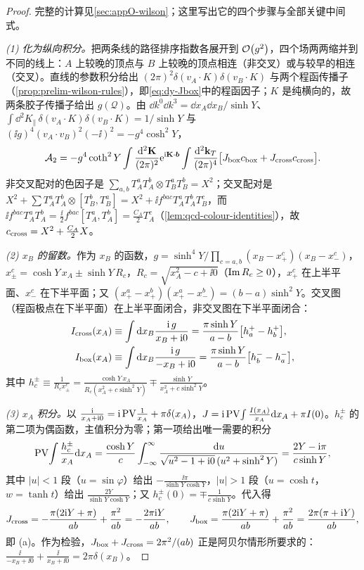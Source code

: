 \begin{proof}
完整的计算见\cref{sec:appO-wilson}；这里写出它的四个步骤与全部关键中间式。

\emph{(1) 化为纵向积分。}把两条线的路径排序指数各展开到 $\mathcal{O}\!\left(g^2\right)$，四个场两两缩并到不同的线上：$A$ 上较晚的顶点与 $B$ 上较晚的顶点相连（非交叉）或与较早的相连（交叉）。直线的参数积分给出 $(2\pi)^2\delta(v_A\cdot K)\delta(v_B\cdot K)$ 与两个程函传播子（\cref{prop:prelim-wilson-rules}），即\cref{eq:dy-Jbox}中的程函因子；$K$ 是纯横向的，故两条胶子传播子给出 $g(\mathcal Q)$。由 $\dd k^0\dd k^3=\dd x_A\dd x_B/\sinh Y$、$\int\dd^2K_\parallel\,\delta(v_A\cdot K)\delta(v_B\cdot K)=1/\sinh Y$ 与 $(\ii g)^4(v_A\cdot v_B)^2(-\ii)^2=-g^4\cosh^2Y$，
\[
\mathcal A_2=-g^4\coth^2Y\int\frac{\mathrm{d}^2\mathbf K}{(2\pi)^2}\mathrm{e}^{\mathrm{i}\mathbf K\cdot\boldsymbol b}\int\frac{\mathrm{d}^2\mathbf k_T}{(2\pi)^4}\big[J_{\rm box}c_{\rm box}+J_{\rm cross}c_{\rm cross}\big].
\]
非交叉配对的色因子是 $\sum_{a,b}T^a_AT^b_A\otimes T^a_BT^b_B=X^2$；交叉配对是 $X^2+\sum T^a_AT^b_A\otimes[T^b_B,T^a_B]=X^2+\ii f^{bac}T^a_AT^b_AT^c_B$，而 $\ii f^{bac}T^a_AT^b_A=\frac\ii2f^{bac}[T^a_A,T^b_A]=\frac{C_A}2T^c_A$（\cref{lem:qcd-colour-identities}），故 $c_{\rm cross}=X^2+\frac{C_A}2X$。

\emph{(2) $x_B$ 的留数。}作为 $x_B$ 的函数，$g=\sinh^4Y\big/\prod_{c=a,b}(x_B-x^c_+)(x_B-x^c_-)$，$x^c_\pm=\cosh Y\,x_A\pm\sinh Y\,R_c$，$R_c=\sqrt{x_A^2-c+\ii0}$（$\operatorname{Im} R_c\ge0$），$x^c_+$ 在上半平面、$x^c_-$ 在下半平面；又 $(x^a_+-x^b_+)(x^a_+-x^b_-)=(b-a)\sinh^2Y$。交叉图（程函极点在下半平面）在上半平面闭合，非交叉图在下半平面闭合：
\[
\begin{aligned}
I_{\rm cross}(x_A)&\equiv\int\mathrm{d} x_B\frac{\mathrm{i}\,g}{x_B+\mathrm{i}0}=\frac{\pi\sinh Y}{a-b}\big[h^+_a-h^+_b\big],\\
I_{\rm box}(x_A)&\equiv\int\mathrm{d} x_B\frac{\mathrm{i}\,g}{-x_B+\mathrm{i}0}=\frac{\pi\sinh Y}{a-b}\big[h^-_b-h^-_a\big],
\end{aligned}
\]
其中 $h^\pm_c\equiv\frac{1}{R_cx^c_\pm}=\frac{\cosh Y\,x_A}{R_c(x_A^2+c\sinh^2Y)}\mp\frac{\sinh Y}{x_A^2+c\sinh^2Y}$。

\emph{(3) $x_A$ 积分。}以 $\frac{\mathrm{i}}{x_A+\mathrm{i}0}=\mathrm{i}\,{\rm PV}\frac1{x_A}+\pi\delta(x_A)$，$J=\mathrm{i}\,{\rm PV}\!\int\frac{I(x_A)}{x_A}\mathrm{d} x_A+\pi I(0)$。$h^\pm_c$ 的第二项为偶函数，主值积分为零；第一项给出唯一需要的积分
\[
{\rm PV}\!\int\frac{h^\pm_c}{x_A}\mathrm{d} x_A=\frac{\cosh Y}{c}\int_{-\infty}^{\infty}\frac{\mathrm{d} u}{\sqrt{u^2-1+\mathrm{i}0}\,(u^2+\sinh^2Y)}=\frac{2Y-\mathrm{i}\pi}{c\sinh Y},
\]
其中 $|u|<1$ 段（$u=\sin\varphi$）给出 $-\frac{\ii\pi}{\sinh Y\cosh Y}$，$|u|>1$ 段（$u=\cosh t$，$w=\tanh t$）给出 $\frac{2Y}{\sinh Y\cosh Y}$；又 $h^\pm_c(0)=\mp\frac1{c\sinh Y}$。代入得
\[
J_{\rm cross}=-\frac{\pi(2\mathrm{i} Y+\pi)}{ab}+\frac{\pi^2}{ab}=-\frac{2\pi\mathrm{i} Y}{ab},\qquad
J_{\rm box}=\frac{\pi(2\mathrm{i} Y+\pi)}{ab}+\frac{\pi^2}{ab}=\frac{2\pi(\pi+\mathrm{i} Y)}{ab},
\]
即 (a)。作为检验，$J_{\rm box}+J_{\rm cross}=2\pi^2/(ab)$ 正是阿贝尔情形所要求的：$\frac{\ii}{-x_B+\ii0}+\frac{\ii}{x_B+\ii0}=2\pi\delta(x_B)$。


\end{proof}
